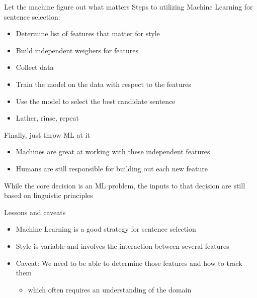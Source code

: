\documentclass[10pt, compress]{beamer}
\begin{document}
\begin{frame}{Let the machine figure out what matters}
	Steps to utilizing Machine Learning for sentence selection:

	\begin{itemize}
		\item Determine list of features that matter for style
		\item Build independent weighers for features
		\item Collect data
		\item Train the model on the data with respect to the features
		\item Use the model to select the best candidate sentence
		\item Lather, rinse, repeat
	\end{itemize}
\end{frame}


\begin{frame}{Finally, just throw ML at it}

	\begin{itemize}
		\item Machines are great at working with these independent features
		\item Humans are still responsible for building out each new feature\pause
	\end{itemize}
    While the core decision is an ML problem, the inputs to that
    decision are still based on linguistic principles

\end{frame}


\begin{frame}{Lessons and caveats}
	\begin{itemize}
		\item Machine Learning is a good strategy for sentence selection
		\item Style is variable and involves the interaction between several features \pause
		\item \alert{Caveat:} We need to be able to determine those features and how to track them
		\begin{itemize}
			\item which often requires an understanding of the domain
		\end{itemize}
	\end{itemize}
\end{frame}
\end{document}
